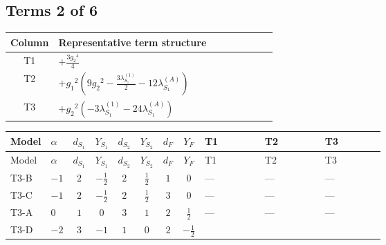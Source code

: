 \documentclass[8pt]{article}
\begin{document}
\begin{landscape}
\subsection*{Terms 2 of 6}
\begin{center}
\begin{tabular}{@{}c >{\raggedright\arraybackslash}p{0.82\linewidth}@{}}
\toprule
Column & Representative term structure \\
\midrule
T1 & \(\displaystyle +\frac{3 {g_2}^4}{4}\) \\
\midrule
T2 & \(\displaystyle +{g_1}^2 \left(9 {g_2}^2-\frac{3 {\lambda_{S_1}^{(1)}}}{2}-12 {\lambda_{S_1}^{(A)}}\right)\) \\
\midrule
T3 & \(\displaystyle +{g_2}^2 (-3 {\lambda_{S_1}^{(1)}}-24 {\lambda_{S_1}^{(A)}})\) \\
\midrule
\bottomrule
\end{tabular}
\end{center}
\smallskip
\tiny
\begin{longtable}{@{}llcccccc >{\raggedright\arraybackslash}p{0.21\linewidth} >{\raggedright\arraybackslash}p{0.21\linewidth} >{\raggedright\arraybackslash}p{0.21\linewidth}@{}}
\toprule
Model & $\alpha$ & $d_{S_1}$ & $Y_{S_1}$ & $d_{S_2}$ & $Y_{S_2}$ & $d_F$ & $Y_F$ & T1 & T2 & T3 \\
\midrule
\endfirsthead
\toprule
Model & $\alpha$ & $d_{S_1}$ & $Y_{S_1}$ & $d_{S_2}$ & $Y_{S_2}$ & $d_F$ & $Y_F$ & T1 & T2 & T3 \\
\midrule
\endhead
T3-B & $-1$ & $2$ & $-\frac{1}{2}$ & $2$ & $\frac{1}{2}$ & $1$ & $0$ & --- & --- & --- \\
\midrule
T3-C & $-1$ & $2$ & $-\frac{1}{2}$ & $2$ & $\frac{1}{2}$ & $3$ & $0$ & --- & --- & --- \\
\midrule
T3-A & $0$ & $1$ & $0$ & $3$ & $1$ & $2$ & $\frac{1}{2}$ & --- & --- & --- \\
\midrule
T3-D & $-2$ & $3$ & $-1$ & $1$ & $0$ & $2$ & $-\frac{1}{2}$ & \scriptsize\adjustbox{max width=\linewidth}{$\begin{gathered} +\frac{3 {g_2}^4}{4}\end{gathered}$} & \scriptsize\adjustbox{max width=\linewidth}{$\begin{gathered} +{g_1}^2 \left(9 {g_2}^2-\frac{3 {\lambda_{S_1}^{(1)}}}{2}-12 {\lambda_{S_1}^{(A)}}\right)\end{gathered}$} & \scriptsize\adjustbox{max width=\linewidth}{$\begin{gathered} +{g_2}^2 (-3 {\lambda_{S_1}^{(1)}}-24 {\lambda_{S_1}^{(A)}})\end{gathered}$} \\

\end{longtable}
\end{landscape}
\end{document}
